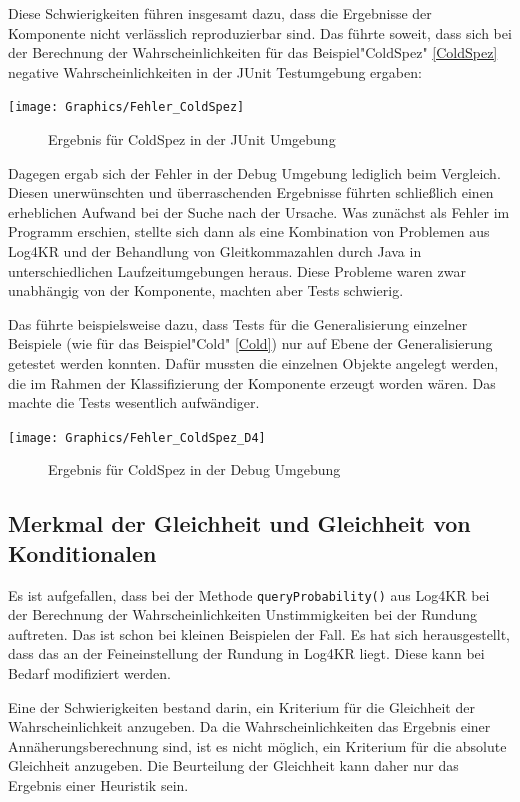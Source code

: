\documentclass[a4paper, 11pt]{book}
\begin{document}
{Diese Schwierigkeiten führen insgesamt dazu, dass die Ergebnisse der Komponente nicht verlässlich reproduzierbar sind.
Das führte soweit, dass sich bei der Berechnung der Wahrscheinlichkeiten für das Beispiel"{}ColdSpez"{} \ref{ColdSpez} negative Wahrscheinlichkeiten in der JUnit Testumgebung ergaben:

\texttt{[image: Graphics/Fehler\_ColdSpez]}
\begin{figure}[h]
	\caption{Ergebnis für ColdSpez in der JUnit Umgebung}
\end{figure}

Dagegen ergab sich der Fehler in der Debug Umgebung lediglich beim Vergleich. Diesen unerwünschten und überraschenden Ergebnisse führten schließlich einen erheblichen Aufwand bei der Suche nach der Ursache. Was zunächst als Fehler im Programm erschien, stellte sich dann als eine Kombination von Problemen aus Log4KR und der Behandlung von Gleitkommazahlen durch Java in unterschiedlichen Laufzeitumgebungen heraus. Diese Probleme waren zwar unabhängig von der Komponente, machten aber Tests schwierig.


Das führte beispielsweise dazu, dass Tests für die Generalisierung einzelner Beispiele (wie für das Beispiel"{}Cold"{} \ref{Cold}) nur auf Ebene der Generalisierung getestet werden konnten. 
Dafür mussten die einzelnen Objekte angelegt werden, die im Rahmen der Klassifizierung der Komponente erzeugt worden wären. Das machte die Tests wesentlich aufwändiger. 


\texttt{[image: Graphics/Fehler\_ColdSpez\_D4]} \label{Fehler_ColdSpez_D4}
\begin{figure}[h]
	\caption{Ergebnis für ColdSpez in der Debug Umgebung}
	
\end{figure}




\subsection{Merkmal der Gleichheit und Gleichheit von Konditionalen} \label{Gleichheit}
Es ist aufgefallen, dass bei der Methode \texttt{queryProbability()} aus Log4KR bei der Berechnung der Wahrscheinlichkeiten Unstimmigkeiten bei der Rundung auftreten. Das ist schon bei kleinen Beispielen der Fall. Es hat sich herausgestellt, dass das an der Feineinstellung der Rundung in Log4KR liegt. Diese kann bei Bedarf modifiziert werden.

Eine der Schwierigkeiten bestand darin, ein Kriterium für die Gleichheit der Wahrscheinlichkeit anzugeben. Da die Wahrscheinlichkeiten das Ergebnis einer Annäherungsberechnung sind, ist es nicht möglich, ein Kriterium für die absolute Gleichheit anzugeben. Die Beurteilung der Gleichheit kann daher nur das Ergebnis einer Heuristik sein.

}
\end{document}
